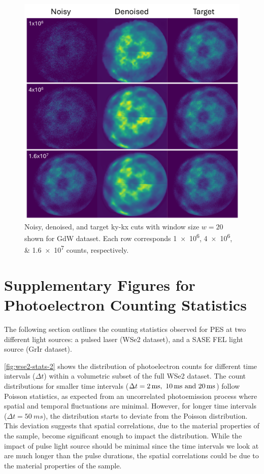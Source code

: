 \begin{figure}[h]
    \centering
    \includegraphics[width=1\linewidth]{images/nn_denoised_xy_20_slice.pdf}
    \caption{Noisy, denoised, and target \gls{ky}-\gls{kx} cuts with window size $w=20$ shown for \gls{GdW} dataset. Each row corresponds \numlist{1e6;4e6;1.6e7} counts, respectively.}
    \label{fig:nn-denoised-xy-20-slice}
\end{figure}

\break
\section{Supplementary Figures for Photoelectron Counting Statistics}
The following section outlines the counting statistics observed for \gls{PES} at two different light sources: a pulsed laser (\gls{WSe2} dataset), and a \gls{SASE} \gls{FEL} light source (\gls{GrIr} dataset). 

\cref{fig:wse2-stats-2} shows the distribution of photoelectron counts for different time intervals ($\Delta t$) within a volumetric subset of the full \gls{WSe2} dataset. The count distributions for smaller time intervals ($\Delta t = \qtylist{2;10;20}{ms}$) follow Poisson statistics, as expected from an uncorrelated photoemission process where spatial and temporal fluctuations are minimal. However, for longer time intervals ($\Delta t = \qty{50}{ms}$), the distribution starts to deviate from the Poisson distribution. This deviation suggests that spatial correlations, due to the material properties of the sample, become significant enough to impact the distribution. While the impact of pulse light source should be minimal since the time intervals we look at are much longer than the pulse durations, the spatial correlations could be due to the material properties of the sample.


